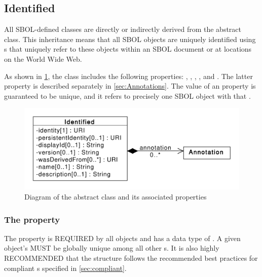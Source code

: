 \subsection{Identified}
\label{sec:Identified}

All SBOL-defined classes are directly or indirectly derived from the   abstract class.
This inheritance means that all SBOL objects are uniquely identified using s that uniquely refer to these objects within an SBOL document or at locations on the World Wide Web.

As shown in \ref{uml:identified}, the  class includes the following properties: , , , , and . The latter property is described separately in \ref{sec:Annotations}. The value of an  property is guaranteed to be unique, and it refers to precisely one SBOL object with that .


\begin{figure}[ht]
\begin{center}
\includegraphics[scale=0.6]{uml/identified}
\caption[]{Diagram of the  abstract class and its associated properties}
\label{uml:identified}
\end{center}
\end{figure}

\subsubsection*{The  property}
\label{sec:identity}
The  property is REQUIRED by all  objects and has a data type of . A given  object's   MUST be globally unique among all other  s. It is also highly RECOMMENDED that the  structure follows the recommended best practices for compliant s specified in \ref{sec:compliant}.

